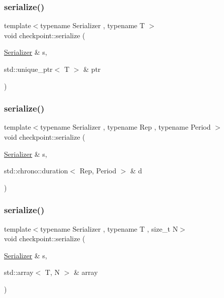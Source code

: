 \mbox{\label{namespacecheckpoint_a3af28ec72bdc4efb0185562379ea3f8d}} 
\subsubsection{\texorpdfstring{serialize()}{serialize()}\hspace{0.1cm}{\footnotesize\ttfamily [3/25]}}
{\footnotesize\ttfamily template$<$typename Serializer , typename T $>$ \\
void checkpoint\+::serialize (\begin{DoxyParamCaption}\item[{\hyperlink{structcheckpoint_1_1_serializer}{Serializer} \&}]{s,  }\item[{std\+::unique\+\_\+ptr$<$ T $>$ \&}]{ptr }\end{DoxyParamCaption})}

\mbox{\label{namespacecheckpoint_aec244476371c452d9d9318b9d5b24401}} 
\subsubsection{\texorpdfstring{serialize()}{serialize()}\hspace{0.1cm}{\footnotesize\ttfamily [4/25]}}
{\footnotesize\ttfamily template$<$typename Serializer , typename Rep , typename Period $>$ \\
void checkpoint\+::serialize (\begin{DoxyParamCaption}\item[{\hyperlink{structcheckpoint_1_1_serializer}{Serializer} \&}]{s,  }\item[{std\+::chrono\+::duration$<$ Rep, Period $>$ \&}]{d }\end{DoxyParamCaption})}

\mbox{\label{namespacecheckpoint_a976e83bf5f22b7bfc5036fd829be039e}} 
\subsubsection{\texorpdfstring{serialize()}{serialize()}\hspace{0.1cm}{\footnotesize\ttfamily [5/25]}}
{\footnotesize\ttfamily template$<$typename Serializer , typename T , size\+\_\+t N$>$ \\
void checkpoint\+::serialize (\begin{DoxyParamCaption}\item[{\hyperlink{structcheckpoint_1_1_serializer}{Serializer} \&}]{s,  }\item[{std\+::array$<$ T, N $>$ \&}]{array }\end{DoxyParamCaption})}

